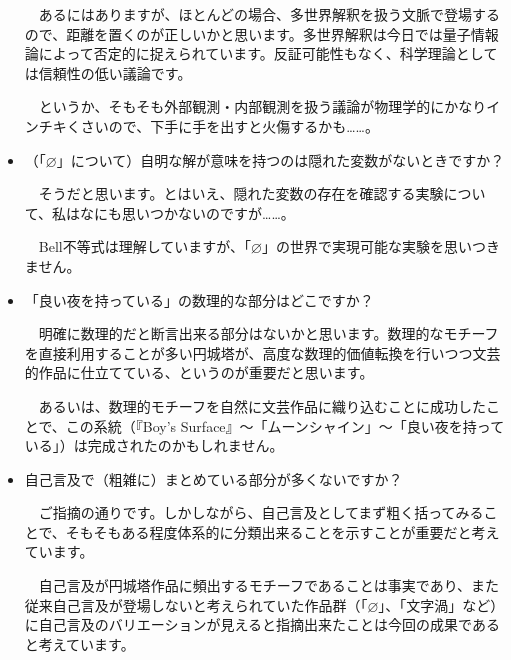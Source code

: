 \documentclass[10pt, a5paper, twoside]{jsarticle}
\begin{document}
\begin{itemize}
			\vspace{1mm}

			　あるにはありますが、ほとんどの場合、多世界解釈を扱う文脈で登場するので、距離を置くのが正しいかと思います。多世界解釈は今日では量子情報論によって否定的に捉えられています。反証可能性もなく、科学理論としては信頼性の低い議論です。
			
			　というか、そもそも外部観測・内部観測を扱う議論が物理学的にかなりインチキくさいので、下手に手を出すと火傷するかも……。

			\vspace{1mm}

			\item （「$ \varnothing$」について）自明な解が意味を持つのは隠れた変数がないときですか？

			\vspace{2mm}

			　そうだと思います。とはいえ、隠れた変数の存在を確認する実験について、私はなにも思いつかないのですが……。

			　Bell不等式は理解していますが、「$ \varnothing$」の世界で実現可能な実験を思いつきません。

			\vspace{2mm}

			\item 「良い夜を持っている」の数理的な部分はどこですか？

			\vspace{1mm}

			　明確に数理的だと断言出来る部分はないかと思います。数理的なモチーフを直接利用することが多い円城塔が、高度な数理的価値転換を行いつつ文芸的作品に仕立てている、というのが重要だと思います。

			　あるいは、数理的モチーフを自然に文芸作品に織り込むことに成功したことで、この系統（『Boy's Surface』〜「ムーンシャイン」〜「良い夜を持っている」）は完成されたのかもしれません。

			\vspace{2mm}

			\item 自己言及で（粗雑に）まとめている部分が多くないですか？

			\vspace{1mm}

			　ご指摘の通りです。しかしながら、自己言及としてまず粗く括ってみることで、そもそもある程度体系的に分類出来ることを示すことが重要だと考えています。

			　自己言及が円城塔作品に頻出するモチーフであることは事実であり、また従来自己言及が登場しないと考えられていた作品群（「$ \varnothing $」、「文字渦」など）に自己言及のバリエーションが見えると指摘出来たことは今回の成果であると考えています。


\end{itemize}
\end{document}
